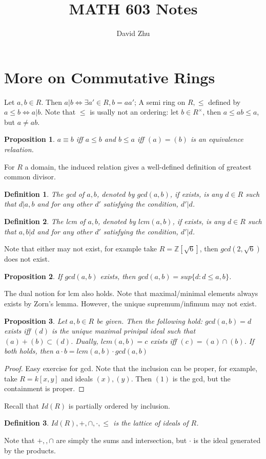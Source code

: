\documentclass{article}
\title{MATH 603 Notes}
\author{David Zhu}
\newtheorem{proposition}{Proposition}[section]
\newtheorem{definition}{Definition}[section]
\begin{document}
\maketitle

\section{More on Commutative Rings}
Let $a,b\in R$. Then $a|b \iff \exists a'\in R, b=aa'$;
A semi ring on $R,\leq$ defined by $a\leq b \iff a|b$. Note that $\leq $ is usally not an ordering: let $b\in R^{\times}$, then $a\leq ab\leq a$, but $a\neq ab$.
\begin{proposition}
$a\equiv b$ iff $a\leq b$ and $b\leq a$ iff $(a)=(b)$ is an equivalence relaation.
\end{proposition}
For $R$ a domain, the induced relation gives a well-defined definition of greatest common divisor.
\begin{definition}
    The gcd of $a,b$, denoted by $gcd(a,b)$, if exists, is any $d\in R$ such that $d|a,b$ and for any other $d'$ satisfying the condition, $d'|d$.
\end{definition}
\begin{definition}
    The lcm of $a,b$, denoted by $lcm(a,b)$, if exists, is any  $d\in R$ such that $a,b|d$ and for any other $d'$ satisfying the condition, $d'|d$.
\end{definition}
Note that either may not exist, for example take $R=\mathbb Z[\sqrt{6}]$, then $gcd(2,\sqrt{6})$ does not exist. 

\begin{proposition}
    If $gcd(a,b)$ exists, then $gcd(a,b)=sup \{ d:d\leq a,b \}$. 
\end{proposition}
The dual notion for lcm also holds. Note that maximal/minimal elements always exists by Zorn's lemma. However, the unique supremum/infimum may not exist.  

\begin{proposition}
    Let $a,b\in R$ be given. Then the following hold: $gcd(a,b)=d$ exists iff $(d)$ is the unique maximal prinipal ideal such that $(a)+(b)\subset (d)$. Dually, $lcm(a,b)=c$ exists iff $(c)=(a)\cap (b)$. If both holds, then $a\cdot b=lcm(a,b)\cdot gcd(a,b)$
\end{proposition}
\begin{proof}
    Easy exercise for gcd. Note that the inclusion can be proper, for example, take $R=k[x,y]$ and ideals $(x),(y)$. Then $(1)$ is the gcd, but the containment is proper.
\end{proof}
Recall that $Id(R)$ is partially ordered by inclusion. 
\begin{definition}
    $Id(R), +,\cap,\cdot,\leq$ is the lattice of ideals of $R$.
\end{definition}
Note that $+,,\cap$ are simply the sums and intersection, but $\cdot$ is the ideal generated by the products. 
\end{document}
